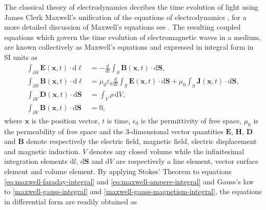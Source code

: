 The classical theory of electrodynamics decribes the time evolution of light using James Clerk Maxwell's unification of the equations of electrodynamics \cite{Maxwell:1863ur}, for a more detailed discussion of Maxwell's equations see \cite{Balanis:ui,Jackson:490457}. The resulting coupled equations which govern the time evolution of electromagnetic waves in a medium, are known collectively as Maxwell's equations and expressed in integral form in SI units as
\begin{subequations}
\begin{align}
    \int_{\partial S} \mathbf{E}(\mathbf{x},t) \cdot \mathrm{d}\boldsymbol{\ell}  &= - \frac{d}{dt} \int_{S} \mathbf{B}(\mathbf{x},t) \cdot \mathrm{d}\mathbf{S}, \label{eq:maxwell-faraday-integral} \\
    \int_{\partial S} \mathbf{B}(\mathbf{x},t) \cdot \mathrm{d}\boldsymbol{\ell} &= \mu_0 \varepsilon_0 \frac{d}{dt} \int_{S} \mathbf{E}(\mathbf{x},t) \cdot \mathrm{d}\mathbf{S} +  \mu_0 \int_{S} \mathbf{J}(\mathbf{x},t) \cdot \mathrm{d}\mathbf{S}, \label{eq:maxwell-ampere-integral} \\
    \int_{\partial V} \mathbf{D}(\mathbf{x},t)\cdot\mathrm{d}\mathbf{S} &= \int_V \rho \,\mathrm{d}V, \label{maxwell-gauss-integral} \\
    \int_{\partial V} \mathbf{B}(\mathbf{x},t)\cdot\mathrm{d}\mathbf{S} &= 0, \label{maxwell-gauss-magnetism-integral}
\end{align}
\end{subequations}
where $\mathbf{x}$ is the position vector, $t$ is time, $\epsilon_0$ is the permittivity of free space, $\mu_0$ is the permeability of free space and the 3-dimensional vector quantities $\mathbf{E}$, $\mathbf{H}$, $\mathbf{D}$ and $\mathbf{B}$ denote respectively the electric field, magnetic field, electric displacement and magnetic induction.
$V$ denotes any closed volume while the infinitesimal integration elements $\mathrm{d}l$, $\mathrm{d}\mathbf{S}$ and $\mathrm{d}V$ are respectively a line element, vector surface element and volume element.
By applying Stokes' Theorem to equations \ref{eq:maxwell-faraday-integral} and \ref{eq:maxwell-ampere-integral} and Gauss's law to \ref{maxwell-gauss-integral} and \ref{maxwell-gauss-magnetism-integral}, the equations in differential form are readily obtained as
